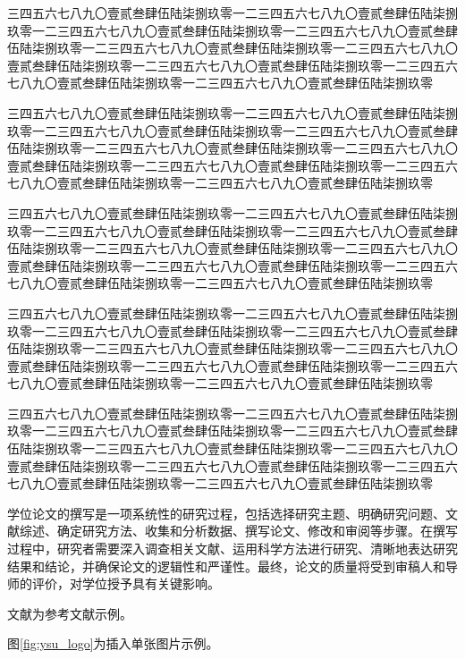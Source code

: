 \documentclass[master,academic]{ysuthesis} %
\begin{document}
		三四五六七八九〇壹贰叁肆伍陆柒捌玖零一二三四五六七八九〇壹贰叁肆伍陆柒捌玖零一二三四五六七八九〇壹贰叁肆伍陆柒捌玖零一二三四五六七八九〇壹贰叁肆伍陆柒捌玖零一二三四五六七八九〇壹贰叁肆伍陆柒捌玖零一二三四五六七八九〇壹贰叁肆伍陆柒捌玖零一二三四五六七八九〇壹贰叁肆伍陆柒捌玖零一二三四五六七八九〇壹贰叁肆伍陆柒捌玖零一二三四五六七八九〇壹贰叁肆伍陆柒捌玖零

		三四五六七八九〇壹贰叁肆伍陆柒捌玖零一二三四五六七八九〇壹贰叁肆伍陆柒捌玖零一二三四五六七八九〇壹贰叁肆伍陆柒捌玖零一二三四五六七八九〇壹贰叁肆伍陆柒捌玖零一二三四五六七八九〇壹贰叁肆伍陆柒捌玖零一二三四五六七八九〇壹贰叁肆伍陆柒捌玖零一二三四五六七八九〇壹贰叁肆伍陆柒捌玖零一二三四五六七八九〇壹贰叁肆伍陆柒捌玖零一二三四五六七八九〇壹贰叁肆伍陆柒捌玖零

		三四五六七八九〇壹贰叁肆伍陆柒捌玖零一二三四五六七八九〇壹贰叁肆伍陆柒捌玖零一二三四五六七八九〇壹贰叁肆伍陆柒捌玖零一二三四五六七八九〇壹贰叁肆伍陆柒捌玖零一二三四五六七八九〇壹贰叁肆伍陆柒捌玖零一二三四五六七八九〇壹贰叁肆伍陆柒捌玖零一二三四五六七八九〇壹贰叁肆伍陆柒捌玖零一二三四五六七八九〇壹贰叁肆伍陆柒捌玖零一二三四五六七八九〇壹贰叁肆伍陆柒捌玖零

		三四五六七八九〇壹贰叁肆伍陆柒捌玖零一二三四五六七八九〇壹贰叁肆伍陆柒捌玖零一二三四五六七八九〇壹贰叁肆伍陆柒捌玖零一二三四五六七八九〇壹贰叁肆伍陆柒捌玖零一二三四五六七八九〇壹贰叁肆伍陆柒捌玖零一二三四五六七八九〇壹贰叁肆伍陆柒捌玖零一二三四五六七八九〇壹贰叁肆伍陆柒捌玖零一二三四五六七八九〇壹贰叁肆伍陆柒捌玖零一二三四五六七八九〇壹贰叁肆伍陆柒捌玖零

		三四五六七八九〇壹贰叁肆伍陆柒捌玖零一二三四五六七八九〇壹贰叁肆伍陆柒捌玖零一二三四五六七八九〇壹贰叁肆伍陆柒捌玖零一二三四五六七八九〇壹贰叁肆伍陆柒捌玖零一二三四五六七八九〇壹贰叁肆伍陆柒捌玖零一二三四五六七八九〇壹贰叁肆伍陆柒捌玖零一二三四五六七八九〇壹贰叁肆伍陆柒捌玖零一二三四五六七八九〇壹贰叁肆伍陆柒捌玖零一二三四五六七八九〇壹贰叁肆伍陆柒捌玖零

		学位论文的撰写是一项系统性的研究过程，包括选择研究主题、明确研究问题、文献综述、确定研究方法、收集和分析数据、撰写论文、修改和审阅等步骤。在撰写过程中，研究者需要深入调查相关文献、运用科学方法进行研究、清晰地表达研究结果和结论，并确保论文的逻辑性和严谨性。最终，论文的质量将受到审稿人和导师的评价，对学位授予具有关键影响。

		文献\cite{texbook,latex:companion,latex2e,knuth:1984,lesk:1977}为参考文献示例。

		图\ref{fig:ysu_logo}为插入单张图片示例。
\end{document}
